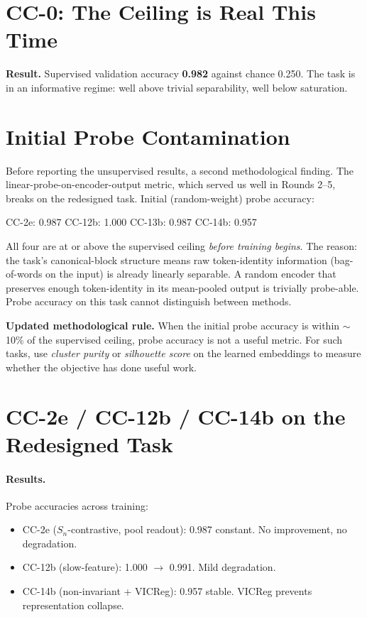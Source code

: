 \documentclass[10pt, twocolumn, a4paper]{article}
\newcommand{\Sn}{S_n}
\begin{document}
\section{CC-0: The Ceiling is Real This Time}

\textbf{Result.} Supervised validation accuracy \textbf{0.982} against chance 0.250. The task is in an informative regime: well above trivial separability, well below saturation.

\section{Initial Probe Contamination}

Before reporting the unsupervised results, a second methodological finding. The linear-probe-on-encoder-output metric, which served us well in Rounds 2--5, breaks on the redesigned task. Initial (random-weight) probe accuracy:
\begin{center}\small
CC-2e: 0.987 \quad CC-12b: 1.000 \quad CC-13b: 0.987 \quad CC-14b: 0.957
\end{center}
All four are at or above the supervised ceiling \emph{before training begins}. The reason: the task's canonical-block structure means raw token-identity information (bag-of-words on the input) is already linearly separable. A random encoder that preserves enough token-identity in its mean-pooled output is trivially probe-able. Probe accuracy on this task cannot distinguish between methods.

\textbf{Updated methodological rule.} When the initial probe accuracy is within $\sim$10\% of the supervised ceiling, probe accuracy is not a useful metric. For such tasks, use \emph{cluster purity} or \emph{silhouette score} on the learned embeddings to measure whether the objective has done useful work.

\section{CC-2e / CC-12b / CC-14b on the Redesigned Task}

\paragraph{Results.} Probe accuracies across training:
\begin{itemize}[nosep]
\item CC-2e ($\Sn$-contrastive, pool readout): 0.987 constant. No improvement, no degradation.
\item CC-12b (slow-feature): 1.000 $\to$ 0.991. Mild degradation.
\item CC-14b (non-invariant + VICReg): 0.957 stable. VICReg prevents representation collapse.
\end{itemize}
\end{document}
